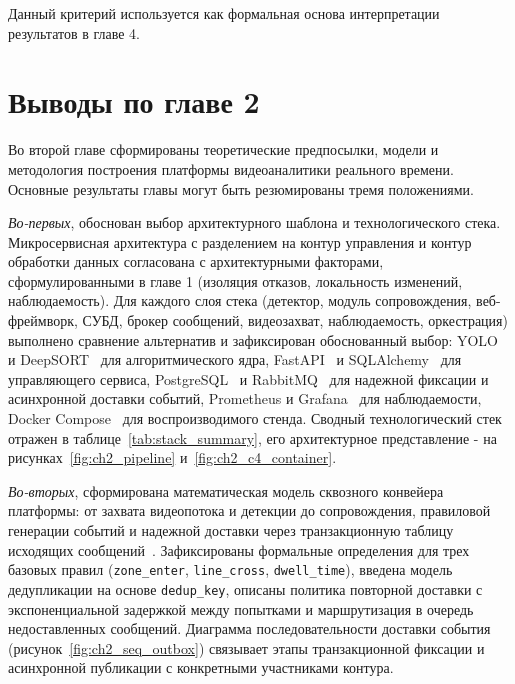 Данный критерий используется как формальная основа интерпретации результатов в главе 4.

\section*{Выводы по главе 2}

Во второй главе сформированы теоретические предпосылки, модели и методология построения платформы видеоаналитики реального времени. Основные результаты главы могут быть резюмированы тремя положениями.

\textit{Во-первых}, обоснован выбор архитектурного шаблона и технологического стека. Микросервисная архитектура с разделением на контур управления и контур обработки данных согласована с архитектурными факторами, сформулированными в главе 1 (изоляция отказов, локальность изменений, наблюдаемость). Для каждого слоя стека (детектор, модуль сопровождения, веб-фреймворк, СУБД, брокер сообщений, видеозахват, наблюдаемость, оркестрация) выполнено сравнение альтернатив и зафиксирован обоснованный выбор: YOLO~\cite{redmon2016yolo,redmon2018yolov3,ultralytics_docs} и DeepSORT~\cite{wojke2017deepsort,kalman1960,kuhn1955hungarian} для алгоритмического ядра, FastAPI~\cite{fastapi_docs} и SQLAlchemy~\cite{sqlalchemy_docs} для управляющего сервиса, PostgreSQL~\cite{postgresql_docs} и RabbitMQ~\cite{rabbitmq_docs,rabbitmq_confirms,rabbitmq_dlq} для надежной фиксации и асинхронной доставки событий, Prometheus и Grafana~\cite{prometheus_docs,grafana_docs} для наблюдаемости, Docker Compose~\cite{docker_docs} для воспроизводимого стенда. Сводный технологический стек отражен в таблице~\ref{tab:stack_summary}, его архитектурное представление - на рисунках~\ref{fig:ch2_pipeline} и~\ref{fig:ch2_c4_container}.

\textit{Во-вторых}, сформирована математическая модель сквозного конвейера платформы: от захвата видеопотока и детекции до сопровождения, правиловой генерации событий и надежной доставки через транзакционную таблицу исходящих сообщений~\cite{transactional_outbox,richardson_microservices}. Зафиксированы формальные определения для трех базовых правил (\texttt{zone\_enter}, \texttt{line\_cross}, \texttt{dwell\_time}), введена модель дедупликации на основе \texttt{dedup\_key}, описаны политика повторной доставки с экспоненциальной задержкой между попытками и маршрутизация в очередь недоставленных сообщений. Диаграмма последовательности доставки события (рисунок~\ref{fig:ch2_seq_outbox}) связывает этапы транзакционной фиксации и асинхронной публикации с конкретными участниками контура.

